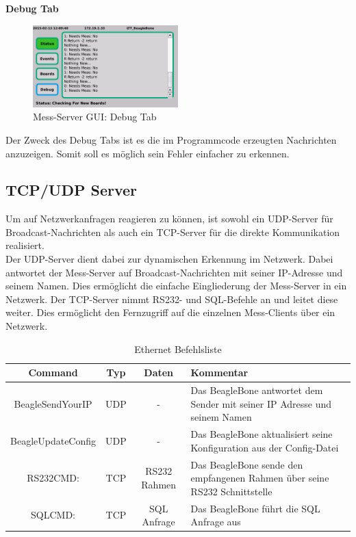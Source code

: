 \textbf{Debug Tab}

\begin{figure}[H]
\begin{center}
\includegraphics[width=0.5\textwidth ]{img/GUI/Server_GUI_Debug2.png}
\caption{Mess-Server GUI: Debug Tab}
\label{figure_MessServerGUIDebug}
\end{center}
\end{figure}

Der Zweck des Debug Tabs ist es die im Programmcode erzeugten Nachrichten anzuzeigen. Somit soll es möglich sein Fehler einfacher zu erkennen.


\subsection{TCP/UDP Server}
\label{section_TCPUDPServer}
Um auf Netzwerkanfragen reagieren zu können, ist sowohl ein UDP-Server für Broadcast-Nachrichten als auch ein TCP-Server für die direkte Kommunikation realisiert.\\
Der UDP-Server dient dabei zur dynamischen Erkennung im Netzwerk. Dabei antwortet der Mess-Server auf Broadcast-Nachrichten mit seiner IP-Adresse und seinem Namen. Dies ermöglicht die einfache Eingliederung der Mess-Server in ein Netzwerk.
Der TCP-Server nimmt RS232- und SQL-Befehle an und leitet diese weiter. Dies ermöglicht den Fernzugriff auf die einzelnen Mess-Clients über ein Netzwerk. 

\begin{table}[H]
\begin{center}
\begin{tabularx}{\textwidth}{|c|c|c|X|}\hline 
 Command & Typ & Daten & Kommentar \\ \hline
 BeagleSendYourIP & UDP & - & Das BeagleBone antwortet dem Sender mit seiner IP Adresse und seinem Namen  \\ \hline
 BeagleUpdateConfig & UDP & - & Das BeagleBone aktualisiert seine Konfiguration aus der Config-Datei \\ \hline
 RS232CMD: & TCP & RS232 Rahmen & Das BeagleBone sende den empfangenen Rahmen über seine RS232 Schnittstelle \\ \hline
 SQLCMD: & TCP & SQL Anfrage & Das BeagleBone führt die SQL Anfrage aus \\ \hline
\end{tabularx}
\caption{Ethernet Befehlsliste}
\label{table_EthernetCommands}
\end{center}
\end{table}

